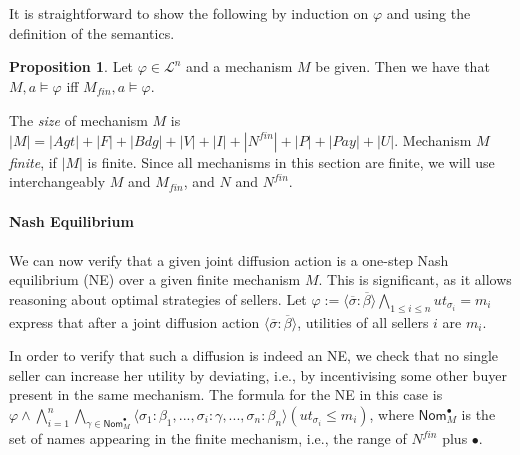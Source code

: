 \documentclass[letterpaper]{article} %
\theoremstyle{definition}
\newtheorem{proposition}{Proposition}
\newcommand{\Pay}{\mathit{Pay}}
\newcommand{\Nfin}{N^{\mathit{fin}}}
\newcommand{\Mfin}{M_{\mathit{fin}}}
\begin{document}
It is straightforward to show the following by induction on $\varphi$ and using the definition of the semantics.
\begin{proposition}
Let $\varphi \in \mathcal{L}^n$ and a mechanism $M$ be given. Then we have that $M,a \models \varphi$ iff $\Mfin,a \models \varphi$.
\end{proposition}

The \emph{size} of mechanism $M$ %
is $|M| = |Agt| + |F| + |Bdg| + |V| + |I| + |\Nfin| + |P| + |\Pay| + |U|$.
Mechanism $M$ \emph{finite}, if $|M|$ is finite. Since all mechanisms in this section are finite, we will %
use interchangeably $M$ and $\Mfin$, and $N$ and $\Nfin$.

\paragraph{Nash Equilibrium} %
We can now verify that a given joint diffusion action is a one-step Nash equilibrium (NE) over a given finite mechanism $M$. This is significant, as it allows reasoning about optimal strategies of sellers. %
Let $\varphi := \langle \overline{\sigma}: \overline{\beta}\rangle \bigwedge_{1\leqslant i \leqslant n} ut_{\sigma_i} = m_i$ express that after a joint diffusion action $\langle \overline{\sigma}: \overline{\beta}\rangle$, utilities of all sellers $i$ are $m_i$. 

In order to verify that such a diffusion is indeed an NE, we check that no single seller can increase her utility by deviating, i.e., by incentivising some other buyer present in the same mechanism. 
The formula for the NE in this case is %
$\varphi \land \bigwedge_{i = 1}^n \bigwedge_{\gamma \in \mathsf{Nom}^{\bullet}_M} \langle\sigma_1: \beta_1, ..., \sigma_i:\gamma, ..., \sigma_n: \beta_n \rangle (ut_{\sigma_i} \leqslant m_i)$,
where $\mathsf{Nom}^{\bullet}_M$ is the set of names appearing in the finite mechanism, i.e., the range of $\Nfin$ plus $\bullet$.
\end{document}
